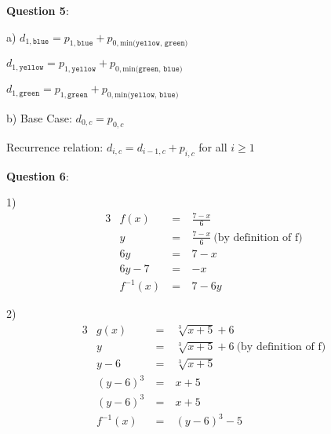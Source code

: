 \documentclass{article} %
\newcommand{\question}[2][]{\begin{flushleft}
        \textbf{Question #1}: #2

\end{flushleft}}
\begin{document}

    \question[5]{}

    a) $d_{1, \texttt{blue}} = p_{1, \texttt{blue}} + p_{0, \text{min(}\texttt{yellow, green}\text{)}}$

    \tabto*{0.98cm} $d_{1, \texttt{yellow}} = p_{1, \texttt{yellow}} + p_{0, \text{min(}\texttt{green, blue}\text{)}}$

    \tabto*{0.98cm} $d_{1, \texttt{green}} = p_{1, \texttt{green}} + p_{0, \text{min(}\texttt{yellow, blue}\text{)}}$

    b) Base Case: $d_{0, c} = p_{0, c}$

    Recurrence relation: $d_{i, c} = d_{i - 1, c} + p_{i, c}$ for all $i \geq 1$

    \newpage

                                                                    

    \question[6]{}

    1) 
    \begin{alignat*}{3}
        & f(x)\      & =\ & \frac{7 - x}{6} \\
        & y \        & =\ & \frac{7 - x}{6}\ \text{(by definition of f)}\\
        & 6y \       & =\ & 7 - x \\
        & 6y - 7 \   & =\ & -x\\
        & f^{-1}(x)\ & =\ & 7-6y
    \end{alignat*}

    2)
    \begin{alignat*}{3}
        &g(x)     \ &=\ &\sqrt[3]{x + 5} + 6 \\
        &y        \ &=\ &\sqrt[3]{x + 5} + 6\ \text{(by definition of f)}\\
        &y - 6    \ &=\ &\sqrt[3]{x + 5} \\
        &(y - 6)^3\ &=\ &x + 5 \\
        &(y - 6)^3\ &=\ &x + 5 \\
        &f^{-1}(x)\ &=\ &(y - 6)^3 - 5
    \end{alignat*}
\end{document}

